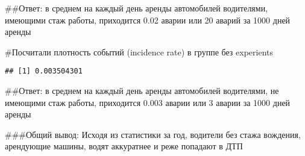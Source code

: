 \documentclass[
]{article}
\newenvironment{Shaded}{\begin{snugshade}}{\end{snugshade}}
\newcommand{\FunctionTok}[1]{\textcolor[rgb]{0.13,0.29,0.53}{\textbf{#1}}}
\newcommand{\NormalTok}[1]{#1}
\newcommand{\OtherTok}[1]{\textcolor[rgb]{0.56,0.35,0.01}{#1}}
\newcommand{\SpecialCharTok}[1]{\textcolor[rgb]{0.81,0.36,0.00}{\textbf{#1}}}
\newcommand{\StringTok}[1]{\textcolor[rgb]{0.31,0.60,0.02}{#1}}
\begin{document}
\#\#Ответ: в среднем на каждый день аренды автомобилей водителями,
имеющими стаж работы, приходится 0.02 аварии или 20 аварий за 1000 дней
аренды

\#Посчитали плотность событий (incidence rate) в группе без experients

\begin{Shaded}
\end{Shaded}

\begin{verbatim}
## [1] 0.003504301
\end{verbatim}

\#\#Ответ: в среднем на каждый день аренды автомобилей водителями, не
имеющими стаж работы, приходится 0.003 аварии или 3 аварии за 1000 дней
аренды

\#\#\#Общий вывод: Исходя из статистики за год, водители без стажа
вождения, арендующие машины, водят аккуратнее и реже попадают в ДТП
\end{document}

